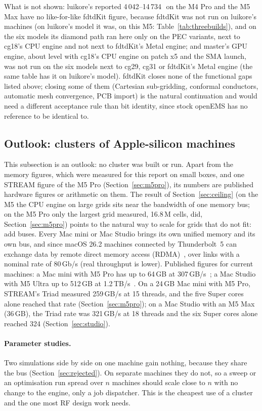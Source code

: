 What is not shown: luikore's reported 4\,042--14\,734\,\MC\ on the M4 Pro and the M5 Max have no like-for-like fdtdKit
figure, because fdtdKit was not run on luikore's machines (on luikore's model it was, on this M5:
Table~\ref{tab:threebuilds}), and on the six models its diamond path ran here only on the PEC variants, next to
cg18's CPU engine and not next to fdtdKit's Metal engine; and master's GPU engine, about level with cg18's CPU engine
on patch x5 and the SMA launch, was not run on the six models next to cg29, cg31 or fdtdKit's Metal engine (the same
table has it on luikore's model). fdtdKit closes none of the
functional gaps listed above; closing some of them (Cartesian sub-gridding, conformal conductors, automatic mesh
convergence, PCB import) is the natural continuation and would need a different acceptance rule than bit identity,
since stock openEMS has no reference to be identical to.

\subsection{Outlook: clusters of Apple-silicon machines}\label{sec:cluster}
This subsection is an outlook: no cluster was built or run. Apart from the memory figures, which were measured for
this report on small boxes, and one STREAM figure of the M5 Pro (Section~\ref{sec:m5pro}), its numbers are published
hardware figures or arithmetic on them. The result of
Section~\ref{sec:ceiling} (on the M5 the CPU engine on large grids sits near the bandwidth of one memory bus; on the M5
Pro only the largest grid measured, 16.8\,M cells, did, Section~\ref{sec:m5pro}) points to the natural way to scale for grids that do
not fit: add buses. Every Mac mini or Mac Studio brings its own unified memory and its own bus, and since macOS 26.2
machines connected by Thunderbolt~5 can exchange data by remote direct memory access (RDMA)~\cite{rdmatb5}, over
links with a nominal rate of 80\,Gb/s (real throughput is lower). Published figures for current machines: a Mac mini
with M5 Pro has up to 64\,GB at 307\,GB/s~\cite{macmini}; a Mac Studio with M5 Ultra up to 512\,GB at
1.2\,TB/s~\cite{studiom5}. On a 24\,GB Mac mini with M5 Pro, STREAM's Triad measured 259\,GB/s at 15 threads, and the
five Super cores alone reached that rate (Section~\ref{sec:m5pro}); on a Mac Studio with an M5 Max (36\,GB), the Triad rate was 321\,GB/s at 18
threads and the six Super cores alone reached 324 (Section~\ref{sec:studio}).

\paragraph{Parameter studies.} Two simulations side by side on one machine gain nothing, because they share the bus
(Section~\ref{sec:rejected}). On separate machines they do not, so a sweep or an optimisation run spread over $n$
machines should scale close to $n$ with no change to the engine, only a job dispatcher. This is the cheapest use of a
cluster and the one most RF design work needs.

